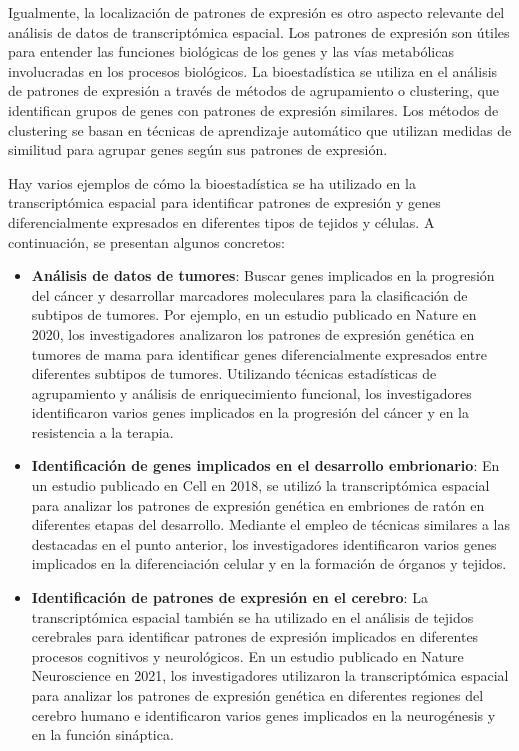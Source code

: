 \documentclass[12pt,oneside]{book} %
\begin{document}
\newpage

Igualmente, la localización de patrones de expresión es otro aspecto relevante del análisis de datos de transcriptómica espacial. Los patrones de expresión son útiles para entender las funciones biológicas de los genes y las vías metabólicas involucradas en los procesos biológicos. La bioestadística se utiliza en el análisis de patrones de expresión a través de métodos de agrupamiento o clustering, que identifican grupos de genes con patrones de expresión similares. Los métodos de clustering se basan en técnicas de aprendizaje automático que utilizan medidas de similitud para agrupar genes según sus patrones de expresión.

Hay varios ejemplos de cómo la bioestadística se ha utilizado en la transcriptómica espacial para identificar patrones de expresión y genes diferencialmente expresados en diferentes tipos de tejidos y células. A continuación, se presentan algunos concretos:

\begin{itemize}
\item
\textbf{Análisis de datos de tumores}: Buscar genes implicados en la progresión del cáncer y desarrollar marcadores moleculares para la clasificación de subtipos de tumores. Por ejemplo, en un estudio publicado en Nature en 2020, los investigadores analizaron los patrones de expresión genética en tumores de mama para identificar genes diferencialmente expresados entre diferentes subtipos de tumores. Utilizando técnicas estadísticas de agrupamiento y análisis de enriquecimiento funcional, los investigadores identificaron varios genes implicados en la progresión del cáncer y en la resistencia a la terapia.
\item
\textbf{Identificación de genes implicados en el desarrollo embrionario}: En un estudio publicado en Cell en 2018, se utilizó la transcriptómica espacial para analizar los patrones de expresión genética en embriones de ratón en diferentes etapas del desarrollo. Mediante el empleo de técnicas similares a las destacadas en el punto anterior, los investigadores identificaron varios genes implicados en la diferenciación celular y en la formación de órganos y tejidos.
\item
\textbf{Identificación de patrones de expresión en el cerebro}: La transcriptómica espacial también se ha utilizado en el análisis de tejidos cerebrales para identificar patrones de expresión implicados en diferentes procesos cognitivos y neurológicos. En un estudio publicado en Nature Neuroscience en 2021, los investigadores utilizaron la transcriptómica espacial para analizar los patrones de expresión genética en diferentes regiones del cerebro humano e identificaron varios genes implicados en la neurogénesis y en la función sináptica. \\ \\
\end{itemize}
\end{document}
